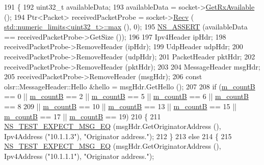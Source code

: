 \begin{DoxyCode}
191 \{
192   uint32\_t availableData;
193   availableData = socket->\hyperlink{classns3_1_1Socket_ad35d8931e53ae0754ee864acb1cecd0e}{GetRxAvailable} ();
194   Ptr<Packet> receivedPacketProbe = socket->\hyperlink{classns3_1_1Socket_a8949b1f844aae563446f2f4c5be8827a}{Recv} (
      \hyperlink{80211b_8c_affe776513b24d84b39af8ab0930fef7f}{std::numeric\_limits<uint32\_t>::max} (), 0);
195   \hyperlink{assert_8h_a6dccdb0de9b252f60088ce281c49d052}{NS\_ASSERT} (availableData == receivedPacketProbe->GetSize ());
196 
197   Ipv4Header ipHdr;
198   receivedPacketProbe->RemoveHeader (ipHdr);
199   UdpHeader udpHdr;
200   receivedPacketProbe->RemoveHeader (udpHdr);
201   PacketHeader pktHdr;
202   receivedPacketProbe->RemoveHeader (pktHdr);
203 
204   MessageHeader msgHdr;
205   receivedPacketProbe->RemoveHeader (msgHdr);
206   \textcolor{keyword}{const} olsr::MessageHeader::Hello &hello = msgHdr.GetHello ();
207 
208   \textcolor{keywordflow}{if} (\hyperlink{classns3_1_1olsr_1_1TcRegressionTest_a600c2880459f6b10640afc51fa268c91}{m\_countB} == 0 || \hyperlink{classns3_1_1olsr_1_1TcRegressionTest_a600c2880459f6b10640afc51fa268c91}{m\_countB} == 2 || \hyperlink{classns3_1_1olsr_1_1TcRegressionTest_a600c2880459f6b10640afc51fa268c91}{m\_countB} == 5 || 
      \hyperlink{classns3_1_1olsr_1_1TcRegressionTest_a600c2880459f6b10640afc51fa268c91}{m\_countB} == 6 || \hyperlink{classns3_1_1olsr_1_1TcRegressionTest_a600c2880459f6b10640afc51fa268c91}{m\_countB} == 8
209       || \hyperlink{classns3_1_1olsr_1_1TcRegressionTest_a600c2880459f6b10640afc51fa268c91}{m\_countB} == 10 || \hyperlink{classns3_1_1olsr_1_1TcRegressionTest_a600c2880459f6b10640afc51fa268c91}{m\_countB} == 13 || \hyperlink{classns3_1_1olsr_1_1TcRegressionTest_a600c2880459f6b10640afc51fa268c91}{m\_countB} == 15 || 
      \hyperlink{classns3_1_1olsr_1_1TcRegressionTest_a600c2880459f6b10640afc51fa268c91}{m\_countB} == 17 || \hyperlink{classns3_1_1olsr_1_1TcRegressionTest_a600c2880459f6b10640afc51fa268c91}{m\_countB} == 19)
210     \{
211       \hyperlink{group__testing_ga7304ba46a28d8cf08dfdfd6499cf7068}{NS\_TEST\_EXPECT\_MSG\_EQ} (msgHdr.GetOriginatorAddress (), Ipv4Address (\textcolor{stringliteral}{"10.1.1.3"}),
       \textcolor{stringliteral}{"Originator address."});
212     \}
213   \textcolor{keywordflow}{else}
214     \{
215       \hyperlink{group__testing_ga7304ba46a28d8cf08dfdfd6499cf7068}{NS\_TEST\_EXPECT\_MSG\_EQ} (msgHdr.GetOriginatorAddress (), Ipv4Address (\textcolor{stringliteral}{"10.1.1.1"}),
       \textcolor{stringliteral}{"Originator address."});

\end{DoxyCode}
